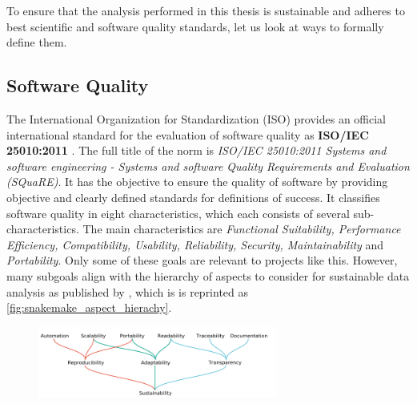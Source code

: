 To ensure that the analysis performed in this thesis is sustainable and adheres to best scientific and software quality standards, let us look at ways to formally define them.

\subsection{Software Quality}
\label{sec:reproducibility}

The International Organization for Standardization (ISO) provides an official international standard for the evaluation of software quality as \textbf{ISO/IEC 25010:2011} \cite{2013ISOI}. The full title of the norm is \textit{ISO/IEC 25010:2011 Systems and software engineering - Systems and software Quality Requirements and Evaluation (SQuaRE)}. It has the objective to ensure the quality of software by providing objective and clearly defined standards for definitions of success. It classifies software quality in eight characteristics, which each consists of several sub-characteristics. The main characteristics are \textit{Functional Suitability, Performance Efficiency, Compatibility, Usability, Reliability, Security, Maintainability} and \textit{Portability}. %
Only some of these goals are relevant to projects like this. However, many subgoals  align with the hierarchy of aspects to consider for sustainable data analysis as published by \textcite{Molder2021a}, which is is reprinted as \autoref{fig:snakemake_aspect_hierachy}.


\begin{figure}[H]
	\centering
	\includegraphics[width=0.7\textwidth]{graphics/stolenfigures/snakemake_aspect_hierachy.png}
\end{figure}

